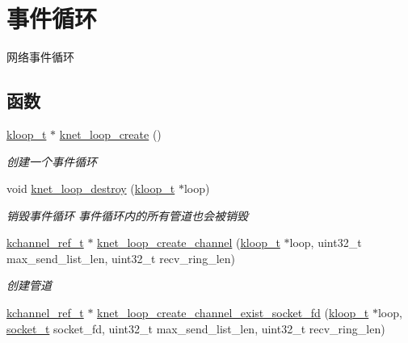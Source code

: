 \hypertarget{a00108}{}\section{事件循环}
\label{a00108}


网络事件循环  


\subsection*{函数}
\begin{DoxyCompactItemize}
\item 
\hyperlink{a00053_a97fc76209a58362019f1ded9169e397f_a97fc76209a58362019f1ded9169e397f}{kloop\+\_\+t} $\ast$ \hyperlink{a00108_ga2e4181ebe9c1769be90bb8dc0e5cdffe_ga2e4181ebe9c1769be90bb8dc0e5cdffe}{knet\+\_\+loop\+\_\+create} ()
\begin{DoxyCompactList}\small\item\em 创建一个事件循环 \end{DoxyCompactList}\item 
void \hyperlink{a00108_ga390ea3161f935d0d3a411df8752d8b9f_ga390ea3161f935d0d3a411df8752d8b9f}{knet\+\_\+loop\+\_\+destroy} (\hyperlink{a00053_a97fc76209a58362019f1ded9169e397f_a97fc76209a58362019f1ded9169e397f}{kloop\+\_\+t} $\ast$loop)
\begin{DoxyCompactList}\small\item\em 销毁事件循环 事件循环内的所有管道也会被销毁 \end{DoxyCompactList}\item 
\hyperlink{a00053_a3b7e82599367eade261456f60ebe2cd9_a3b7e82599367eade261456f60ebe2cd9}{kchannel\+\_\+ref\+\_\+t} $\ast$ \hyperlink{a00108_gac1f9a4848c06c2a6a2723d7b991b4394_gac1f9a4848c06c2a6a2723d7b991b4394}{knet\+\_\+loop\+\_\+create\+\_\+channel} (\hyperlink{a00053_a97fc76209a58362019f1ded9169e397f_a97fc76209a58362019f1ded9169e397f}{kloop\+\_\+t} $\ast$loop, uint32\+\_\+t max\+\_\+send\+\_\+list\+\_\+len, uint32\+\_\+t recv\+\_\+ring\+\_\+len)
\begin{DoxyCompactList}\small\item\em 创建管道 \end{DoxyCompactList}\item 
\hyperlink{a00053_a3b7e82599367eade261456f60ebe2cd9_a3b7e82599367eade261456f60ebe2cd9}{kchannel\+\_\+ref\+\_\+t} $\ast$ \hyperlink{a00108_gaddfd5a2709d0c26ada8a2dd3fd6a5b62_gaddfd5a2709d0c26ada8a2dd3fd6a5b62}{knet\+\_\+loop\+\_\+create\+\_\+channel\+\_\+exist\+\_\+socket\+\_\+fd} (\hyperlink{a00053_a97fc76209a58362019f1ded9169e397f_a97fc76209a58362019f1ded9169e397f}{kloop\+\_\+t} $\ast$loop, \hyperlink{a00053_a0d9e0afbf02fb6ed6c5b1415dce51b05_a0d9e0afbf02fb6ed6c5b1415dce51b05}{socket\+\_\+t} socket\+\_\+fd, uint32\+\_\+t max\+\_\+send\+\_\+list\+\_\+len, uint32\+\_\+t recv\+\_\+ring\+\_\+len)

\end{DoxyCompactItemize}

